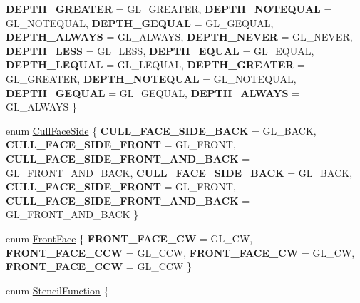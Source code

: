\begin{DoxyCompactItemize}
{\bfseries D\+E\+P\+T\+H\+\_\+\+G\+R\+E\+A\+T\+ER} = G\+L\+\_\+\+G\+R\+E\+A\+T\+ER, 
{\bfseries D\+E\+P\+T\+H\+\_\+\+N\+O\+T\+E\+Q\+U\+AL} = G\+L\+\_\+\+N\+O\+T\+E\+Q\+U\+AL, 
{\bfseries D\+E\+P\+T\+H\+\_\+\+G\+E\+Q\+U\+AL} = G\+L\+\_\+\+G\+E\+Q\+U\+AL, 
{\bfseries D\+E\+P\+T\+H\+\_\+\+A\+L\+W\+A\+YS} = G\+L\+\_\+\+A\+L\+W\+A\+YS, 
\newline
{\bfseries D\+E\+P\+T\+H\+\_\+\+N\+E\+V\+ER} = G\+L\+\_\+\+N\+E\+V\+ER, 
{\bfseries D\+E\+P\+T\+H\+\_\+\+L\+E\+SS} = G\+L\+\_\+\+L\+E\+SS, 
{\bfseries D\+E\+P\+T\+H\+\_\+\+E\+Q\+U\+AL} = G\+L\+\_\+\+E\+Q\+U\+AL, 
{\bfseries D\+E\+P\+T\+H\+\_\+\+L\+E\+Q\+U\+AL} = G\+L\+\_\+\+L\+E\+Q\+U\+AL, 
\newline
{\bfseries D\+E\+P\+T\+H\+\_\+\+G\+R\+E\+A\+T\+ER} = G\+L\+\_\+\+G\+R\+E\+A\+T\+ER, 
{\bfseries D\+E\+P\+T\+H\+\_\+\+N\+O\+T\+E\+Q\+U\+AL} = G\+L\+\_\+\+N\+O\+T\+E\+Q\+U\+AL, 
{\bfseries D\+E\+P\+T\+H\+\_\+\+G\+E\+Q\+U\+AL} = G\+L\+\_\+\+G\+E\+Q\+U\+AL, 
{\bfseries D\+E\+P\+T\+H\+\_\+\+A\+L\+W\+A\+YS} = G\+L\+\_\+\+A\+L\+W\+A\+YS
 \}
\item 
enum \hyperlink{classRenderState_a9b99d2625b13af77f1f8fa8101e3ad85}{Cull\+Face\+Side} \{ \newline
{\bfseries C\+U\+L\+L\+\_\+\+F\+A\+C\+E\+\_\+\+S\+I\+D\+E\+\_\+\+B\+A\+CK} = G\+L\+\_\+\+B\+A\+CK, 
{\bfseries C\+U\+L\+L\+\_\+\+F\+A\+C\+E\+\_\+\+S\+I\+D\+E\+\_\+\+F\+R\+O\+NT} = G\+L\+\_\+\+F\+R\+O\+NT, 
{\bfseries C\+U\+L\+L\+\_\+\+F\+A\+C\+E\+\_\+\+S\+I\+D\+E\+\_\+\+F\+R\+O\+N\+T\+\_\+\+A\+N\+D\+\_\+\+B\+A\+CK} = G\+L\+\_\+\+F\+R\+O\+N\+T\+\_\+\+A\+N\+D\+\_\+\+B\+A\+CK, 
{\bfseries C\+U\+L\+L\+\_\+\+F\+A\+C\+E\+\_\+\+S\+I\+D\+E\+\_\+\+B\+A\+CK} = G\+L\+\_\+\+B\+A\+CK, 
\newline
{\bfseries C\+U\+L\+L\+\_\+\+F\+A\+C\+E\+\_\+\+S\+I\+D\+E\+\_\+\+F\+R\+O\+NT} = G\+L\+\_\+\+F\+R\+O\+NT, 
{\bfseries C\+U\+L\+L\+\_\+\+F\+A\+C\+E\+\_\+\+S\+I\+D\+E\+\_\+\+F\+R\+O\+N\+T\+\_\+\+A\+N\+D\+\_\+\+B\+A\+CK} = G\+L\+\_\+\+F\+R\+O\+N\+T\+\_\+\+A\+N\+D\+\_\+\+B\+A\+CK
 \}
\item 
enum \hyperlink{classRenderState_ac748310042b020a92ea97ede898be30e}{Front\+Face} \{ {\bfseries F\+R\+O\+N\+T\+\_\+\+F\+A\+C\+E\+\_\+\+CW} = G\+L\+\_\+\+CW, 
{\bfseries F\+R\+O\+N\+T\+\_\+\+F\+A\+C\+E\+\_\+\+C\+CW} = G\+L\+\_\+\+C\+CW, 
{\bfseries F\+R\+O\+N\+T\+\_\+\+F\+A\+C\+E\+\_\+\+CW} = G\+L\+\_\+\+CW, 
{\bfseries F\+R\+O\+N\+T\+\_\+\+F\+A\+C\+E\+\_\+\+C\+CW} = G\+L\+\_\+\+C\+CW
 \}
\item 
enum \hyperlink{classRenderState_a81cc5aa349c93afd42db28eea9de0165}{Stencil\+Function} \{ \newline

\end{DoxyCompactItemize}
